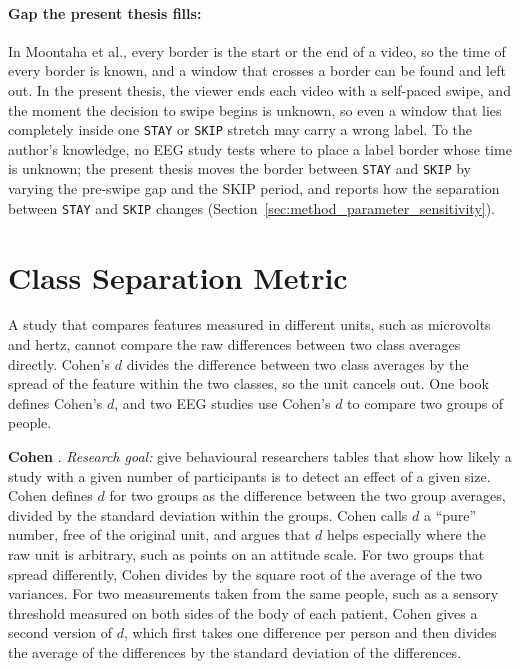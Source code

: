 \documentclass[12pt,a4paper]{report}
\begin{document}
\paragraph{Gap the present thesis fills:} In Moontaha et al., every border is the start or the end of a video, so the time of every border is known, and a window that crosses a border can be found and left out. In the present thesis, the viewer ends each video with a self-paced swipe, and the moment the decision to swipe begins is unknown, so even a window that lies completely inside one \texttt{STAY} or \texttt{SKIP} stretch may carry a wrong label. To the author's knowledge, no EEG study tests where to place a label border whose time is unknown; the present thesis moves the border between \texttt{STAY} and \texttt{SKIP} by varying the pre-swipe gap and the SKIP period, and reports how the separation between \texttt{STAY} and \texttt{SKIP} changes (Section~\ref{sec:method_parameter_sensitivity}).

\section{Class Separation Metric}
\label{sec:lit_class_separation}
A study that compares features measured in different units, such as microvolts and hertz, cannot compare the raw differences between two class averages directly. Cohen's \(d\) divides the difference between two class averages by the spread of the feature within the two classes, so the unit cancels out. One book defines Cohen's \(d\), and two EEG studies use Cohen's \(d\) to compare two groups of people.

\textbf{Cohen} \cite{cohen_statistical_1988}. \emph{Research goal:} give behavioural researchers tables that show how likely a study with a given number of participants is to detect an effect of a given size. Cohen defines \(d\) for two groups as the difference between the two group averages, divided by the standard deviation within the groups. Cohen calls \(d\) a ``pure'' number, free of the original unit, and argues that \(d\) helps especially where the raw unit is arbitrary, such as points on an attitude scale. For two groups that spread differently, Cohen divides by the square root of the average of the two variances. For two measurements taken from the same people, such as a sensory threshold measured on both sides of the body of each patient, Cohen gives a second version of \(d\), which first takes one difference per person and then divides the average of the differences by the standard deviation of the differences.
\end{document}
